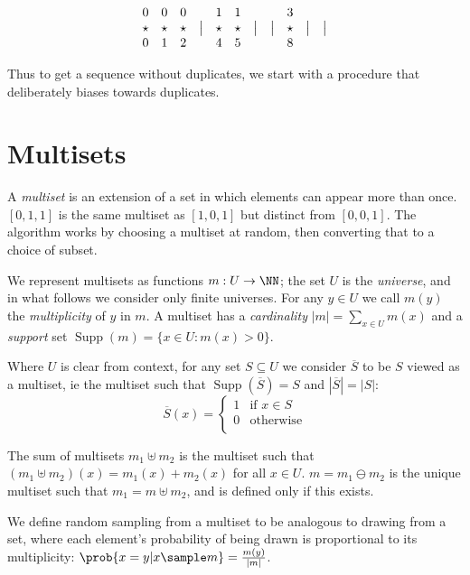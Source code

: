 \documentclass[letterpaper,luatex,11pt]{article}
\DeclareMathOperator{\Supp}{Supp}
\begin{document}
\begin{displaymath}
\begin{array}{ c c c c c c c c c c c }
    0 & 0 & 0 & & 1 & 1 & & & 3 & & \\
    \star & \star & \star & \big| & \star & \star & \big| & \big| & \star & \big| & \big| \\
    0 & 1 & 2 & & 4 & 5 & & & 8 & & \\
\end{array}
\end{displaymath}

Thus to get a sequence without duplicates, we start with a procedure that deliberately
biases towards duplicates.

\section{Multisets}

A \emph{multiset} is an extension of a set in which elements can appear more than once.
$[0, 1, 1]$ is the same multiset as $[1, 0, 1]$ but distinct from $[0, 0, 1]$.
The algorithm works by choosing a multiset at random, then converting that to a choice
of subset.

We represent multisets as functions $m: U \rightarrow \NN$; the set $U$ is the \emph{universe},
and in what follows we consider only finite universes. For any $y \in U$ we call
$m(y)$ the \emph{multiplicity} of $y$ in $m$.
A multiset has a \emph{cardinality} $|m| = \sum_{x \in U} m(x)$
and a \emph{support} set $\Supp(m) = \{x \in U: m(x) > 0\}$.

Where $U$ is clear from context, for any set $S \subseteq U$ we consider
$\overline{S}$ to be $S$ viewed as a multiset, ie the multiset
such that $\Supp(\overline{S}) = S$ and $|\overline{S}| = |S|$:
\begin{displaymath}
    \overline{S}(x) =
    \begin{cases}
        1 & \text{if $x \in S$} \\
        0 & \text{otherwise} \\
    \end{cases}
\end{displaymath}

The sum of multisets $m_1 \uplus m_2$ is the multiset such that
$(m_1 \uplus m_2)(x) = m_1(x) + m_2(x)$ for all $x \in U$.
$m = m_1 \ominus m_2$ is the unique multiset such that $m_1 = m \uplus m_2$,
and is defined only if this exists.

We define random sampling from a multiset to be analogous to drawing from a set,
where each element's probability of being drawn is proportional to its multiplicity:
$\prob{x = y |x \sample m} = \frac{m(y)}{|m|}$.
\end{document}
